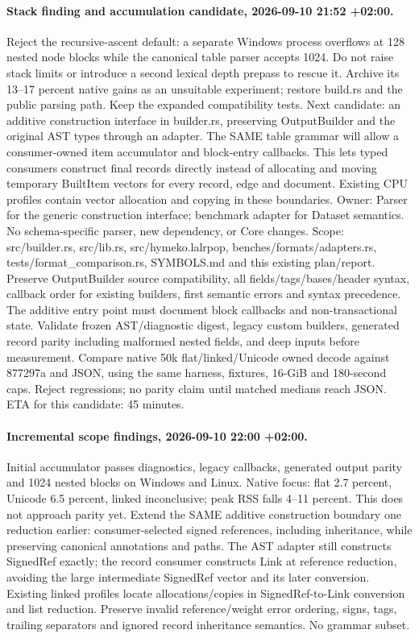 \documentclass[11pt,a4paper]{article}
\begin{document}
\paragraph{Stack finding and accumulation candidate, 2026-09-10 21:52 +02:00.}
Reject the recursive-ascent default: a separate Windows process overflows at
128 nested node blocks while the canonical table parser accepts 1024. Do not
raise stack limits or introduce a second lexical depth prepass to rescue it.
Archive its 13--17 percent native gains as an unsuitable experiment; restore
build.rs and the public parsing path. Keep the expanded compatibility tests.
Next candidate: an additive construction interface in builder.rs, preserving
OutputBuilder and the original AST types through an adapter. The SAME table
grammar will allow a consumer-owned item accumulator and block-entry callbacks.
This lets typed consumers construct final records directly instead of allocating
and moving temporary BuiltItem vectors for every record, edge and document.
Existing CPU profiles contain vector allocation and copying in these boundaries.
Owner: Parser for the generic construction interface; benchmark adapter for
Dataset semantics. No schema-specific parser, new dependency, or Core changes.
Scope: src/builder.rs, src/lib.rs, src/hymeko.lalrpop, benches/formats/adapters.rs,
tests/format\_comparison.rs, SYMBOLS.md and this existing plan/report.
Preserve OutputBuilder source compatibility, all fields/tags/bases/header syntax,
callback order for existing builders, first semantic errors and syntax precedence.
The additive entry point must document block callbacks and non-transactional state.
Validate frozen AST/diagnostic digest, legacy custom builders, generated record
parity including malformed nested fields, and deep inputs before measurement.
Compare native 50k flat/linked/Unicode owned decode against 877297a and JSON,
using the same harness, fixtures, 16-GiB and 180-second caps. Reject regressions;
no parity claim until matched medians reach JSON. ETA for this candidate: 45 minutes.

\paragraph{Incremental scope findings, 2026-09-10 22:00 +02:00.}
Initial accumulator passes diagnostics, legacy callbacks, generated output parity
and 1024 nested blocks on Windows and Linux. Native focus: flat 2.7 percent,
Unicode 6.5 percent, linked inconclusive; peak RSS falls 4--11 percent.
This does not approach parity yet. Extend the SAME additive construction boundary
one reduction earlier: consumer-selected signed references, including inheritance,
while preserving canonical annotations and paths. The AST adapter still constructs
SignedRef exactly; the record consumer constructs Link at reference reduction,
avoiding the large intermediate SignedRef vector and its later conversion.
Existing linked profiles locate allocations/copies in SignedRef-to-Link conversion
and list reduction. Preserve invalid reference/weight error ordering, signs, tags,
trailing separators and ignored record inheritance semantics. No grammar subset.
\end{document}
